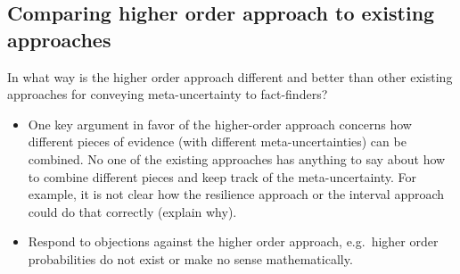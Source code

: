 \documentclass[
  10pt,
  dvipsnames,enabledeprecatedfontcommands]{scrartcl}
\begin{document}
\hypertarget{comparing-higher-order-approach-to-existing-approaches}{%
\subsection{Comparing higher order approach to existing
approaches}\label{comparing-higher-order-approach-to-existing-approaches}}

In what way is the higher order approach different and better than other
existing approaches for conveying meta-uncertainty to fact-finders?

\begin{itemize}
\item
  One key argument in favor of the higher-order approach concerns how
  different pieces of evidence (with different meta-uncertainties) can
  be combined. No one of the existing approaches has anything to say
  about how to combine different pieces and keep track of the
  meta-uncertainty. For example, it is not clear how the resilience
  approach or the interval approach could do that correctly (explain
  why).
\item
  Respond to objections against the higher order approach, e.g.~higher
  order probabilities do not exist or make no sense mathematically.
\end{itemize}
\end{document}
